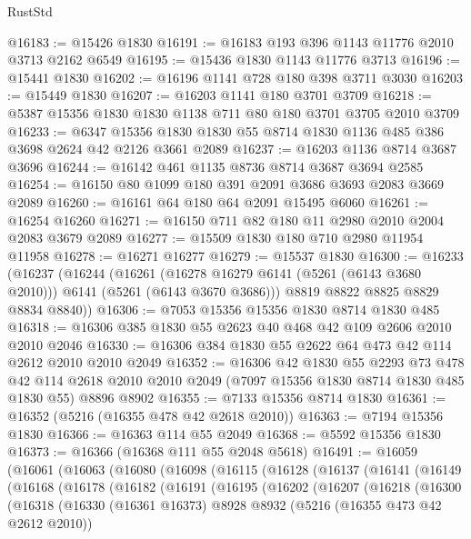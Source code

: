 \begin{lexlean}{RustStd}
\begin{coremodule}
@16183 := @15426 @1830
@16191 := @16183 @193 @396 @1143 @11776 @2010 @3713 @2162 @6549
@16195 := @15436 @1830 @1143 @11776 @3713
@16196 := @15441 @1830
@16202 := @16196 @1141 @728 @180 @398 @3711 @3030
@16203 := @15449 @1830
@16207 := @16203 @1141 @180 @3701 @3709
@16218 := @5387 @15356 @1830 @1830 @1138 @711 @80 @180 @3701 @3705 @2010 @3709
@16233 := @6347 @15356 @1830 @1830 @55 @8714 @1830 @1136 @485 @386 @3698 @2624 @42 @2126 @3661 @2089
@16237 := @16203 @1136 @8714 @3687 @3696
@16244 := @16142 @461 @1135 @8736 @8714 @3687 @3694 @2585
@16254 := @16150 @80 @1099 @180 @391 @2091 @3686 @3693 @2083 @3669 @2089
@16260 := @16161 @64 @180 @64 @2091 @15495 @6060
@16261 := @16254 @16260
@16271 := @16150 @711 @82 @180 @11 @2980 @2010 @2004 @2083 @3679 @2089
@16277 := @15509 @1830 @180 @710 @2980 @11954 @11958
@16278 := @16271 @16277
@16279 := @15537 @1830
@16300 := @16233
    (@16237
      (@16244
        (@16261 (@16278 @16279 @6141 (@5261 (@6143 @3680 @2010))) @6141 (@5261 (@6143 @3670 @3686)))
        @8819
        @8822
        @8825
        @8829
        @8834
        @8840))
@16306 := @7053 @15356 @15356 @1830 @8714 @1830 @485
@16318 := @16306 @385 @1830 @55 @2623 @40 @468 @42 @109 @2606 @2010 @2010 @2046
@16330 := @16306 @384 @1830 @55 @2622 @64 @473 @42 @114 @2612 @2010 @2010 @2049
@16352 := @16306
    @42
    @1830
    @55
    @2293
    @73
    @478
    @42
    @114
    @2618
    @2010
    @2010
    @2049
    (@7097 @15356 @1830 @8714 @1830 @485 @1830 @55)
    @8896
    @8902
@16355 := @7133 @15356 @8714 @1830
@16361 := @16352 (@5216 (@16355 @478 @42 @2618 @2010))
@16363 := @7194 @15356 @1830
@16366 := @16363 @114 @55 @2049
@16368 := @5592 @15356 @1830
@16373 := @16366 (@16368 @111 @55 @2048 @5618)
@16491 := @16059
    (@16061
      (@16063
        (@16080
          (@16098
            (@16115
              (@16128
                (@16137
                  (@16141
                    (@16149
                      (@16168
                        (@16178
                          (@16182
                            (@16191
                              (@16195
                                (@16202
                                  (@16207
                                    (@16218
                                      (@16300
                                        (@16318
                                          (@16330
                                            (@16361 @16373)
                                            @8928
                                            @8932
                                            (@5216 (@16355 @473 @42 @2612 @2010))

\end{coremodule}
\end{lexlean}
